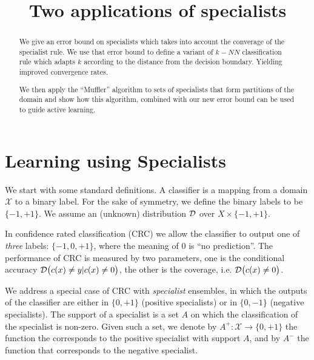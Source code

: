 \documentclass{colt2015} %
\newcommand{\D}{{\cal D}}
\newcommand{\cX}{\mathcal{X}}
\begin{document}
\title{Two applications of specialists}


\maketitle

\begin{abstract}
We give an error bound on specialists which takes into account the
converage of the specialist rule. We use that error bound to define a
variant of $k-NN$ classification rule which adapts $k$ according to
the distance from the decision boundary. Yielding improved convergence
rates.

We then apply the ``Muffler'' algorithm to sets of specialists that
form partitions of the domain and show how this algorithm, combined
with our new error bound can be used to guide active learning.
\end{abstract}

\section{Learning using Specialists}

We start with some standard definitions. A classifier is a
mapping from a domain $\cX$ to a binary label. For the sake of symmetry,
we define the binary labels to be $\{-1,+1\}$. 
We assume an (unknown) distribution $\D$ over $X \times \{-1,+1\}$.

In confidence rated classification (CRC) we allow the classifier to
output one of {\em three} labels: $\{-1,0,+1\}$, where the meaning of
$0$ is ``no prediction''. The performance of CRC is measured by two
parameters, one is the conditional accuracy $\D\bigl(c(x) \neq y | c(x) \neq
0\bigr)$, the other is the coverage, i.e. $\D\bigl(c(x) \neq 0\bigr)$.

We address a special case of CRC with {\em specialist} ensembles, 
in which the outputs of the classifier are either in $\{0,+1\}$ (positive specialists) or in
$\{0,-1\}$ (negative specialists). 
The support of a specialist is a set $A$ on which the classification of
the specialist is non-zero. Given such a set, we denote by $A^+: \cX \to \{0,+1\}$ the
function the corresponds to the positive specialist with support $A$, and by $A^-$ the
function that corresponds to the negative specialist.
\end{document}
